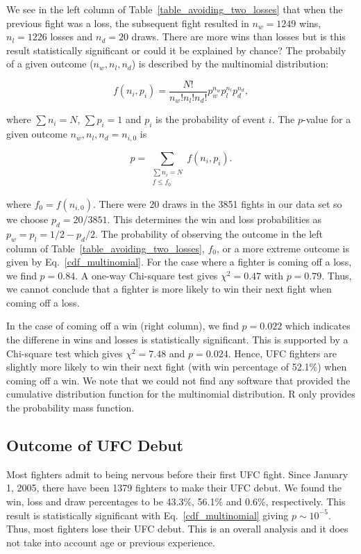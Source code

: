 We see in the left column of Table~\ref{table_avoiding_two_losses} that
when the previous fight was a loss, the subsequent fight resulted
in $n_w=1249$ wins, $n_l=1226$ losses and $n_d=20$ draws. There are more wins than losses but
is this result statistically significant or could it be explained
by chance? The probabily of a given outcome ($n_w, n_l, n_d$) is described by
the multinomial distribution:

\begin{equation}
f(n_i, p_i) = \frac{N!}{n_w! n_l! n_d!}p_w^{n_w}p_l^{n_l}p_d^{n_d},
\end{equation}

\noindent
where $\sum n_i = N$, $\sum p_i=1$ and $p_i$ is the probability
of event $i$. The $p$-value for a given
outcome $n_w, n_l, n_d=n_{i,0}$ is

\begin{equation}
p = \sum_{\substack{{\sum n_i = N} \\ {f \le f_0}}}f(n_i, p_i).
\label{cdf_multinomial}
\end{equation}

\noindent
where $f_0=f(n_{i,0})$.
There were 20 draws in the 3851 fights in our data set so we
choose $p_d=20/3851$. This determines the win and loss probabilities as
$p_w=p_l=1/2 - p_d/2$.
The probability of observing the outcome in the left
column of Table~\ref{table_avoiding_two_losses}, $f_0$, or a more extreme outcome
is given by Eq.~\ref{cdf_multinomial}. For the case where a fighter
is coming off a loss, we find $p=0.84$. A one-way Chi-square test gives $\chi^2=0.47$ with $p=0.79$.
Thus, we cannot conclude that a fighter is more likely to win their next fight
when coming off a loss.

In the case
of coming off a win (right column), we find $p=0.022$ which
indicates the differene in wins and losses is statistically significant. This is supported by a Chi-square test which
gives $\chi^2=7.48$ and $p=0.024$. Hence, 
UFC fighters are slightly more likely to win their next
fight (with win percentage of 52.1\%) when coming off a win.
We note that we could not find any software that provided the cumulative
distribution function for the multinomial distribution. R only provides
the probability mass function.

\subsection*{Outcome of UFC Debut}

Most fighters admit to being nervous before their first UFC fight.
Since January 1, 2005, there have been 1379 fighters to make their UFC debut. We found the
win, loss and draw percentages to be 43.3\%, 56.1\% and 0.6\%, respectively.
This result is statistically significant with Eq.~\ref{cdf_multinomial}
giving $p \sim 10^{-5}$. Thus, most
fighters lose their UFC debut. This is an overall analysis and it does not
take into account age or previous experience.


